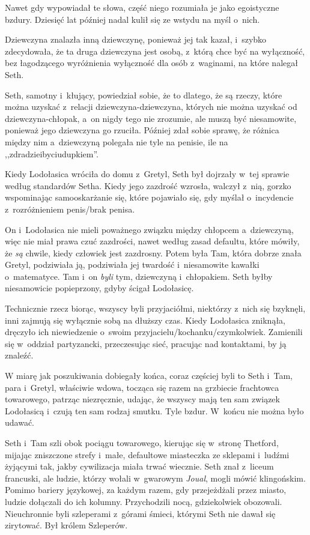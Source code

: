 \documentclass[oneside,polish,11pt,sfheadings]{mwbk}
\begin{document}
Nawet gdy wypowiadał te słowa, część niego rozumiała je jako egoistyczne
bzdury. Dziesięć lat później nadal kulił się ze wstydu na myśl o~nich.

Dziewczyna znalazła inną dziewczynę, ponieważ jej tak kazał, i~szybko
zdecydowała, że ta druga dziewczyna jest osobą, z~którą chce być na
wyłączność, bez łagodzącego wyróżnienia wyłączność dla osób z~waginami,
na które nalegał Seth.

Seth, samotny i~kłujący, powiedział sobie, że to dlatego, że są rzeczy,
które można uzyskać z~relacji dziewczyna-dziewczyna, których nie można
uzyskać od dziewczyna-chłopak, a~on nigdy tego nie zrozumie, ale muszą
być niesamowite, ponieważ jego dziewczyna go rzuciła. Później zdał sobie
sprawę, że różnica między nim a~dziewczyną polegała nie tyle na penisie,
ile na ,,zdradzie\dywiz i\dywiz byciu\dywiz dupkiem''.

Kiedy Lodołasica wróciła do domu z~Gretyl, Seth był dojrzały w~tej
sprawie według standardów Setha. Kiedy jego zazdrość wzrosła, walczył z~nią, gorzko wspominając samooskarżanie się, które pojawiało się, gdy
myślał o~incydencie z~rozróżnieniem penis/brak penisa.

On i~Lodołasica nie mieli poważnego związku między chłopcem a~dziewczyną, więc nie miał prawa czuć zazdrości, nawet według zasad
defaultu, które mówiły, że \textit{są} chwile, kiedy człowiek jest
zazdrosny. Potem była Tam, która dobrze znała Gretyl, podziwiała ją,
podziwiała jej twardość i~niesamowite kawałki o~matematyce. Tam i~on
\textit{byli} tym, dziewczyną i~chłopakiem. Seth byłby niesamowicie
popieprzony, gdyby ścigał Lodołasicę.

Technicznie rzecz biorąc, wszyscy byli przyjaciółmi, niektórzy z~nich
się bzyknęli, inni zajmują się wyłącznie sobą na dłuższy czas. Kiedy
Lodołasica zniknąła, dręczyło ich niewiedzenie o~swoim
przyjacielu/kochanku/czymkolwiek. Zamienili się w~oddział partyzancki,
przeczesując sieć, pracując nad kontaktami, by ją znaleźć.

W miarę jak poszukiwania dobiegały końca, coraz częściej byli to Seth i~Tam, para i~Gretyl, właściwie wdowa, tocząca się razem na grzbiecie
frachtowca towarowego, patrząc niezręcznie, udając, że wszyscy mają ten
sam związek Lodołasicą i~czują ten sam rodzaj smutku. Tyle bzdur. W~końcu nie można było udawać.

Seth i~Tam szli obok pociągu towarowego, kierując się w~stronę Thetford,
mijając zniszczone strefy i~małe, defaultowe miasteczka ze sklepami i~ludźmi żyjącymi tak, jakby cywilizacja miała trwać wiecznie. Seth znał z~liceum francuski, ale ludzie, którzy wołali w~gwarowym \textit{Joual},
mogli mówić klingońskim. Pomimo bariery językowej, za każdym razem, gdy
przejeżdżali przez miasto, ludzie dołączali do ich kolumny. Przychodzili
nocą, gdziekolwiek obozowali. Nieuchronnie byli szleperami z~górami
śmieci, którymi Seth nie dawał się zirytować. Był królem Szleperów.
\end{document}
